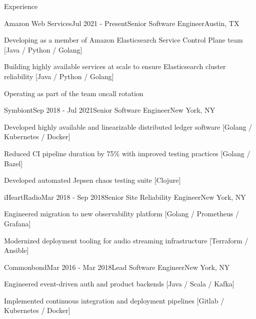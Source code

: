 \documentclass{resume} %
\begin{document}
\begin{rSection}{Experience}

\begin{rSubsection}{Amazon Web Services}{Jul 2021 - Present}{Senior Software Engineer}{Austin, TX}
\item Developing as a member of Amazon Elasticsearch Service Control Plane team {\footnotesize [Java / Python / Golang]}
\item Building highly available services at scale to ensure Elasticsearch cluster reliability {\footnotesize [Java / Python / Golang]}
\item Operating as part of the team oncall rotation

\end{rSubsection}

\begin{rSubsection}{Symbiont}{Sep 2018 - Jul 2021}{Senior Software Engineer}{New York, NY}
\item Developed highly available and linearizable distributed ledger software {\footnotesize [Golang / Kubernetes / Docker]}
\item Reduced CI pipeline duration by 75\% with improved testing practices {\footnotesize [Golang / Bazel]}
\item Developed automated Jepsen chaos testing suite {\footnotesize [Clojure]}

\end{rSubsection}


\begin{rSubsection}{iHeartRadio}{Mar 2018 - Sep 2018}{Senior Site Reliability Engineer}{New York, NY}
\item Engineered migration to new observability platform {\footnotesize [Golang / Prometheus / Grafana]}
\item Modernized deployment tooling for audio streaming infrastructure {\footnotesize [Terraform / Ansible]}

\end{rSubsection}


\begin{rSubsection}{Commonbond}{Mar 2016 - Mar 2018}{Lead Software Engineer}{New York, NY}
\item Engineered event-driven auth and product backends {\footnotesize [Java / Scala / Kafka]}
\item Implemented continuous integration and deployment pipelines {\footnotesize [Gitlab / Kubernetes / Docker]}


\end{rSubsection}
\end{rSection}
\end{document}
